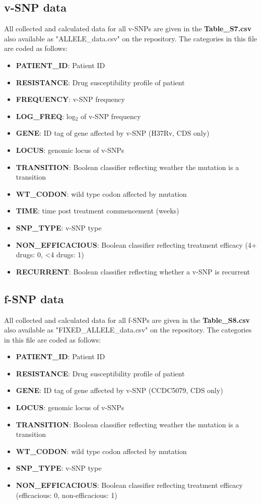 \documentclass[12pt, oneside]{article}   	%
\begin{document}
\subsection{v-SNP data}
All collected and calculated data for all v-SNPs are given in the \textbf{Table\_S7.csv} also available as "ALLELE\_data.csv" on the repository.
The categories in this file are coded as follows:
\begin{itemize}
\item \textbf{PATIENT\_ID}: Patient ID
\item \textbf{RESISTANCE}:  Drug susceptibility profile of patient
\item \textbf{FREQUENCY}: v-SNP frequency
\item \textbf{LOG\_FREQ}: log$_2$ of v-SNP frequency
\item \textbf{GENE}: ID tag of gene affected by v-SNP (H37Rv, CDS only)
\item \textbf{LOCUS}:  genomic locus of v-SNPs
\item \textbf{TRANSITION}: Boolean classifier reflecting weather the mutation is a transition
\item \textbf{WT\_CODON}: wild type codon affected by mutation
\item \textbf{TIME}: time post treatment commencement (weeks)
\item \textbf{SNP\_TYPE}: v-SNP type
\item \textbf{NON\_EFFICACIOUS}: Boolean classifier reflecting treatment efficacy (4+ drugs: 0, <4 drugs: 1)
\item \textbf{RECURRENT}: Boolean classifier reflecting whether a v-SNP is recurrent
\end{itemize}

\subsection{f-SNP data}
All collected and calculated data for all f-SNPs are given in the \textbf{Table\_S8.csv} also available as "FIXED\_ALLELE\_data.csv" on the repository.
The categories in this file are coded as follows:
\begin{itemize}
\item \textbf{PATIENT\_ID}: Patient ID
\item \textbf{RESISTANCE}: Drug susceptibility profile of patient
\item \textbf{GENE}: ID tag of gene affected by v-SNP (CCDC5079, CDS only)
\item \textbf{LOCUS}:  genomic locus of v-SNPs
\item \textbf{TRANSITION}: Boolean classifier reflecting weather the mutation is a transition
\item \textbf{WT\_CODON}: wild type codon affected by mutation
\item \textbf{SNP\_TYPE}: v-SNP type
\item \textbf{NON\_EFFICACIOUS}: Boolean classifier reflecting treatment efficacy (efficacious: 0, non-efficacious: 1)
\end{itemize}
\end{document}
